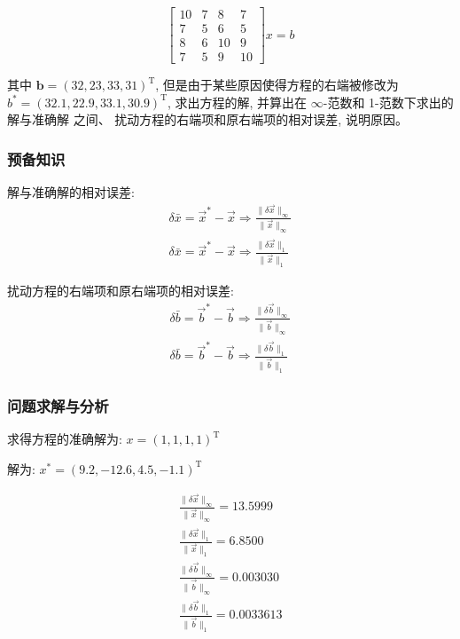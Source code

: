 \documentclass[UTF8]{ctexart}
\begin{document}
$$
    \left[\begin{array}{cccc}
        10 & 7 & 8 & 7 \\
        7 & 5 & 6 & 5 \\
        8 & 6 & 10 & 9 \\
        7 & 5 & 9 & 10
        \end{array}\right] x=b
$$

其中 $\boldsymbol{b}=(32,23,33,31)^{\mathrm{T}}$, 
但是由于某些原因使得方程的右端被修改为 $b^{*}=(32.1,22.9,33.1,30.9)^{\mathrm{T}}$,
求出方程的解, 并算出在 $\infty$-范数和 1-范数下求出的解与准确解 之间、
扰动方程的右端项和原右端项的相对误差, 说明原因。
\subsubsection{预备知识}
解与准确解的相对误差:
\begin{equation}\nonumber
\begin{split}
    \delta \bar{x}=\vec{x}^{*}-\vec{x}\Rightarrow \frac{\|\delta \vec{x}\|_{\infty}}{\|\vec{x}\|_{\infty}}\\
    \delta \bar{x}=\vec{x}^{*}-\vec{x}\Rightarrow \frac{\|\delta \vec{x}\|_{1}}{\|\vec{x}\|_{1}}
\end{split}
\end{equation}

扰动方程的右端项和原右端项的相对误差:
\begin{equation}\nonumber
    \begin{split}
        \delta \bar{b}=\vec{b}^{*}-\vec{b}\Rightarrow \frac{\|\delta \vec{b}\|_{\infty}}{\|\vec{b}\|_{\infty}}\\
        \delta \bar{b}=\vec{b}^{*}-\vec{b}\Rightarrow \frac{\|\delta \vec{b}\|_{1}}{\|\vec{b}\|_{1}}
    \end{split}
  \end{equation}
\subsubsection{问题求解与分析}
求得方程的准确解为: $x=(1,1,1,1)^{\mathrm{T}}$

解为: $x^{*}=(9.2,-12.6,4.5,-1.1)^{\mathrm{T}}$

\begin{equation}\nonumber
    \begin{split}
        \frac{\|\delta \vec{x}\|_{\infty}}{\|\vec{x}\|_{\infty}} = 13.5999\\
        \frac{\|\delta \vec{x}\|_{1}}{\|\vec{x}\|_{1}} = 6.8500\\
        \frac{\|\delta \vec{b}\|_{\infty}}{\|\vec{b}\|_{\infty}} = 0.003030\\
        \frac{\|\delta \vec{b}\|_{1}}{\|\vec{b}\|_{1}} = 0.0033613
    \end{split}
\end{equation}
\end{document}
